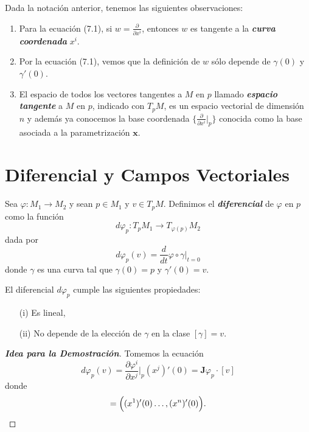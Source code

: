 \begin{observation}
Dada la notaci\'on anterior, tenemos las siguientes observaciones:
\begin{enumerate}[label=(\alph*)]
    \item Para la ecuaci\'on (7.1), si $w=\frac{\partial}{\partial x^i}$, entonces $w$ es tangente a la \textit{\textbf{curva coordenada}} $x^i$.
    \item Por la ecuaci\'on (7.1), vemos que la definici\'on de $w$ s\'olo depende de $\gamma(0)$ y $\gamma'(0)$.
    \item El espacio de todos los vectores tangentes a $M$ en $p$ llamado \textit{\textbf{espacio tangente}} a $M$ en $p$, indicado con $T_pM$, es un espacio vectorial de dimensi\'on $n$ y adem\'as ya conocemos la base coordenada $\{\frac{\partial}{\partial x^i}|_p\}$ conocida como la base asociada a la parametrizaci\'on $\mathbf{x}$.
\end{enumerate}    
\end{observation}

\section{Diferencial y Campos Vectoriales}

\begin{definition}
Sea $\varphi\colon M_1\to M_2$ y sean $p\in M_1$ y $v\in T_pM$. Definimos el \textit{\textbf{diferencial}} de $\varphi$ en $p$ como la funci\'on 
\begin{equation*}
    d\varphi_p\colon T_pM_1\to T_{\varphi(p)}M_2
\end{equation*}
dada por
\begin{equation*}
    d\varphi_p(v)=\frac{d}{dt}\varphi\circ\gamma\Big|_{t=0}
\end{equation*}
donde $\gamma$ es una curva tal que $\gamma(0)=p$ y $\gamma'(0)=v$.
\end{definition}

\begin{theorem}
El diferencial $d\varphi_p$ cumple las siguientes propiedades:
\begin{enumerate}
    \item[(i)] Es lineal,
    \item[(ii)] No depende de la elecci\'on de $\gamma$ en la clase $[\gamma]=v$. 
\end{enumerate}
\end{theorem}
\begin{proof}[\textbf{Idea para la Demostraci\'on}]
Tomemos la ecuaci\'on 
\begin{equation}
    d\varphi_p(v)=\frac{\partial\varphi^i}{\partial x^j}\Big|_p(x^j)'(0)=\mathbf{J}\varphi_p\cdot[v]
\end{equation}
donde 
\begin{equation*}
    [v]=\Bigl((x^1)'(0)\dots,(x^n)'(0)\Bigl).
\end{equation*}
\end{proof}

